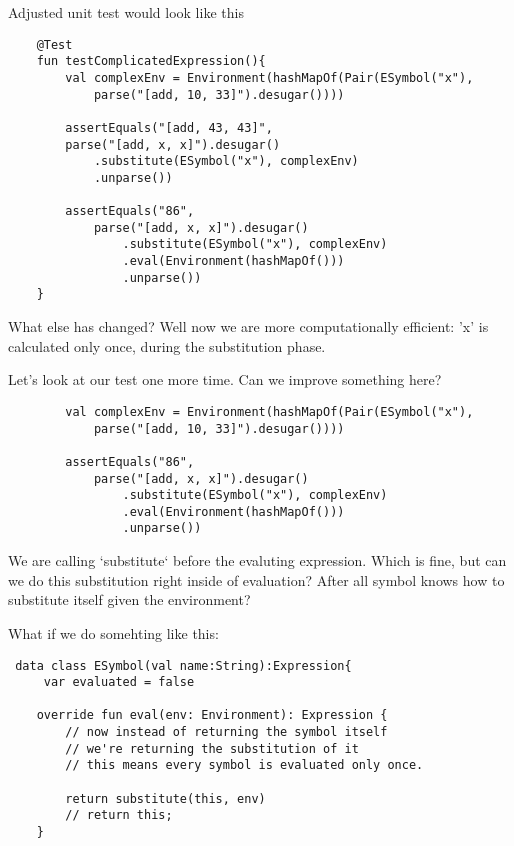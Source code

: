 \documentclass[11pt]{article}
\begin{document}
Adjusted unit test would look like this

\begin{verbatim}
    @Test
    fun testComplicatedExpression(){
        val complexEnv = Environment(hashMapOf(Pair(ESymbol("x"),
            parse("[add, 10, 33]").desugar())))

        assertEquals("[add, 43, 43]",
        parse("[add, x, x]").desugar()
            .substitute(ESymbol("x"), complexEnv)
            .unparse())

        assertEquals("86",
            parse("[add, x, x]").desugar()
                .substitute(ESymbol("x"), complexEnv)
                .eval(Environment(hashMapOf()))
                .unparse())
    }
\end{verbatim}

What else has changed?
Well now we are more computationally efficient: 'x' is calculated only once, during the substitution phase.


Let's look at our test one more time.
Can we improve something here?
\begin{verbatim}
        val complexEnv = Environment(hashMapOf(Pair(ESymbol("x"),
            parse("[add, 10, 33]").desugar())))

        assertEquals("86",
            parse("[add, x, x]").desugar()
                .substitute(ESymbol("x"), complexEnv)
                .eval(Environment(hashMapOf()))
                .unparse())
\end{verbatim}

We are calling `substitute` before the evaluting expression.
Which is fine, but can we do this substitution right inside of evaluation?
After all symbol knows how to substitute itself given the environment?

What if we do somehting like this:

\begin{verbatim}
 data class ESymbol(val name:String):Expression{
     var evaluated = false

    override fun eval(env: Environment): Expression {
        // now instead of returning the symbol itself
        // we're returning the substitution of it
        // this means every symbol is evaluated only once.

        return substitute(this, env)
        // return this;
    }

\end{verbatim}
\end{document}
